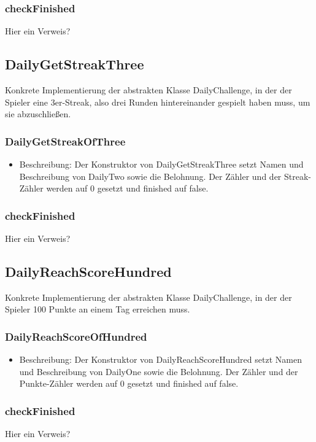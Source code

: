 \documentclass[a4paper]{scrreprt}
\begin{document}
	\subsubsection{checkFinished}
	Hier ein Verweis? \\

	\subsection{DailyGetStreakThree}
	Konkrete Implementierung der abstrakten Klasse DailyChallenge, in der der Spieler eine 3er-Streak, also drei Runden hintereinander gespielt haben muss, um sie abzuschließen.
	\subsubsection{DailyGetStreakOfThree}
	\begin{itemize}
		\item Beschreibung: Der Konstruktor von DailyGetStreakThree setzt Namen und Beschreibung von DailyTwo sowie die Belohnung. Der Zähler und der Streak-Zähler werden auf 0 gesetzt und finished auf false.
	\end{itemize}
	\subsubsection{checkFinished}
	Hier ein Verweis? \\

	\subsection{DailyReachScoreHundred}
	Konkrete Implementierung der abstrakten Klasse DailyChallenge, in der der Spieler 100 Punkte an einem Tag erreichen muss.
	\subsubsection{DailyReachScoreOfHundred}
	\begin{itemize}
		\item Beschreibung: Der Konstruktor von DailyReachScoreHundred setzt Namen und Beschreibung von DailyOne sowie die Belohnung. Der Zähler und der Punkte-Zähler werden auf 0 gesetzt und finished auf false.
	\end{itemize}
	\subsubsection{checkFinished}
	Hier ein Verweis? \\
\end{document}
